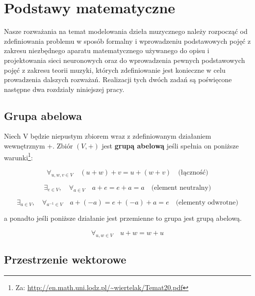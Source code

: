 \chapter{Podstawy matematyczne}

Nasze rozważania na temat modelowania dzieła muzycznego należy rozpocząć od zdefiniowania problemu w sposób formalny i wprowadzeniu podstawowych pojęć z zakresu niezbędnego aparatu matematycznego używanego do opisu i projektowania sieci neuronowych oraz do wprowadzenia pewnych podstawowych pojęć z zakresu teorii muzyki, których zdefiniowanie jest konieczne w celu prowadzenia dalszych rozważań. Realizacji tych dwóch zadań są poświęcone następne dwa rozdziały niniejszej pracy.

\section{Grupa abelowa}
\begin{definicja}
Niech V będzie niepustym zbiorem wraz z zdefiniowanym działaniem wewnętrznym +. Zbiór $(V,+)$ jest \textbf{grupą abelową} jeśli spełnia on poniższe warunki\footnote{Za: \url{http://en.math.uni.lodz.pl/~wiertelak/Temat20.pdf}}:
\end{definicja}

\begin{equation*}
 \forall_{u,w,v \in V} \quad (u + w) + v = u + (w + v) \quad \text{(łączność)}
\end{equation*}

\begin{equation*}
 \exists_{e \in V}, \quad \forall_{a \in V} \quad a  + e = e + a = a \quad \text{(element neutralny)}
 \end{equation*}
 
 \begin{equation*}
     \exists_{a \in V}, \quad \forall_{a^{-1} \in V} \quad 
     a + (-a) = e + (-a) + a = e \quad \text{(elementy odwrotne)}
 \end{equation*}
 
 a ponadto jeśli poniższe działanie jest przemienne to grupa jest grupą abelową.
 
\begin{equation*}
    \forall_{u,w \in V} \quad u + w = w + u
\end{equation*}

\section{Przestrzenie wektorowe}

